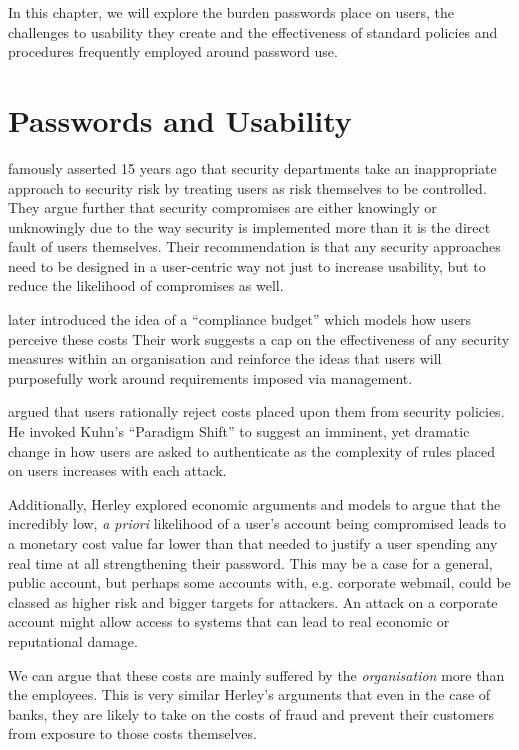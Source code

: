 \documentclass{report}
\begin{document}
In this chapter, we will explore the burden passwords place
on users, the challenges to usability they create and
the effectiveness of standard policies and procedures
frequently employed around password use.

\section{Passwords and Usability}

\textcite{adams1999users} famously asserted 15 years ago that security
departments take an inappropriate approach to security risk
by treating users as risk themselves to be controlled. They
argue further that security compromises are either knowingly
or unknowingly due to the way security is implemented more than
it is the direct fault of users themselves. Their recommendation
is that any security approaches need to be designed in
a user-centric way not just to increase usability, but to
reduce the likelihood of compromises as well.

\textcite{beautement2009compliance} later introduced the idea of a
``compliance budget'' which models how users perceive these costs
Their work suggests a cap on the effectiveness of any
security measures within an organisation and reinforce the ideas
that users will purposefully work around requirements imposed via
management.

\textcite{herley2009so} argued that users rationally reject costs
placed upon them from security policies. He invoked Kuhn's
``Paradigm Shift'' \parencite{kuhn1962structure} to suggest
an imminent, yet dramatic change in
how users are asked to authenticate as the complexity of
rules placed on users increases with each attack.

Additionally, Herley explored economic arguments
and models
to argue that the incredibly low, \emph{a priori} likelihood
of a user's account being compromised leads to a monetary
cost value far lower than that needed to justify a user
spending any real time at all strengthening their password.
This may be a case for a general, public account, but perhaps
some accounts with, e.g. corporate webmail, could be classed
as higher risk and bigger targets for attackers. An attack
on a corporate account might allow access to systems that
can lead to real economic or reputational damage.

We can argue that these costs
are mainly suffered by the \emph{organisation}
more than the employees. This is very similar Herley's
arguments that even in the case of banks, they are likely
to take on the costs of fraud and prevent their customers
from exposure to those costs themselves.
\end{document}
